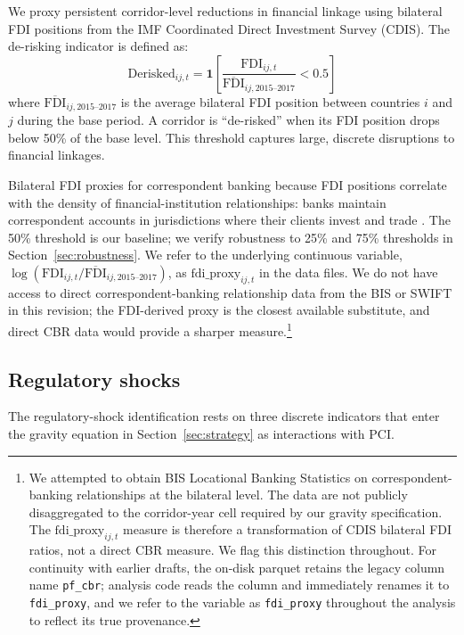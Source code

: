 We proxy persistent corridor-level reductions in financial linkage using bilateral FDI positions from the IMF Coordinated Direct Investment Survey (CDIS). The de-risking indicator is defined as:
\begin{equation}
\text{Derisked}_{ij,t} = \mathbf{1}\left[\frac{\text{FDI}_{ij,t}}{\overline{\text{FDI}}_{ij,2015\text{--}2017}} < 0.5\right]
\label{eq:derisked}
\end{equation}
where $\overline{\text{FDI}}_{ij,2015\text{--}2017}$ is the average bilateral FDI position between countries $i$ and $j$ during the base period. A corridor is ``de-risked'' when its FDI position drops below 50\% of the base level. This threshold captures large, discrete disruptions to financial linkages.

Bilateral FDI proxies for correspondent banking because FDI positions correlate with the density of financial-institution relationships: banks maintain correspondent accounts in jurisdictions where their clients invest and trade \citep{Rice2020_correspondent}. The 50\% threshold is our baseline; we verify robustness to 25\% and 75\% thresholds in Section~\ref{sec:robustness}. We refer to the underlying continuous variable, $\log(\text{FDI}_{ij,t} / \overline{\text{FDI}}_{ij,2015\text{--}2017})$, as $\text{fdi\_proxy}_{ij,t}$ in the data files. We do not have access to direct correspondent-banking relationship data from the BIS or SWIFT in this revision; the FDI-derived proxy is the closest available substitute, and direct CBR data would provide a sharper measure.\footnote{We attempted to obtain BIS Locational Banking Statistics on correspondent-banking relationships at the bilateral level. The data are not publicly disaggregated to the corridor-year cell required by our gravity specification. The $\text{fdi\_proxy}_{ij,t}$ measure is therefore a transformation of CDIS bilateral FDI ratios, not a direct CBR measure. We flag this distinction throughout. For continuity with earlier drafts, the on-disk parquet retains the legacy column name \texttt{pf\_cbr}; analysis code reads the column and immediately renames it to \texttt{fdi\_proxy}, and we refer to the variable as \texttt{fdi\_proxy} throughout the analysis to reflect its true provenance.}

\subsection{Regulatory shocks}
\label{subsec:reg_shocks}

The regulatory-shock identification rests on three discrete indicators that enter the gravity equation in Section~\ref{sec:strategy} as interactions with PCI.

